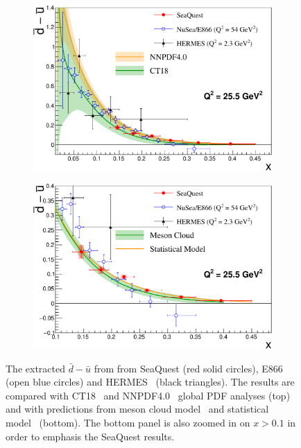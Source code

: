 \documentclass[reprint,aps,unsortedaddress,superscriptaddress,prc,floatfix,showpacs,linenumbers,final]{revtex4-2}
\begin{document}
\begin{figure}[htpb!]
	\centering
	\begin{subfigure}{\linewidth}
		\includegraphics[width=\linewidth]{dbub_diff_with_PDF.pdf}
	\end{subfigure}
	\begin{subfigure}{\linewidth}
		\includegraphics[width=\linewidth]{dbub_diff_with_model.pdf}
	\end{subfigure}
	\caption{The extracted $\bar{d}-\bar{u}$ from from SeaQuest (red solid circles), E866~\cite{towell2001} (open blue circles)
		and HERMES~\cite{ackerstaff1998} (black triangles).
		The results are compared with CT18~\cite{hou2021} and NNPDF4.0~\cite{ball2022a} global PDF analyses (top)
		and with predictions from meson cloud model~\cite{alberg2022} and statistical model~\cite{soffer2019} (bottom).
		The bottom panel is also zoomed in on $x>0.1$ in order to emphasis the SeaQuest results.}
	\label{fig:e906_e866_dbarMubar}
\end{figure}
\end{document}

